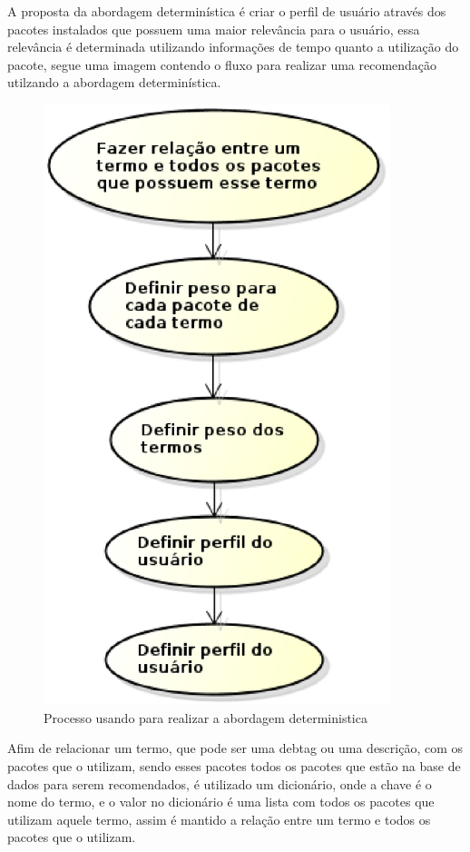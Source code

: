 A proposta da abordagem determinística é criar o perfil de usuário através
dos pacotes instalados que possuem uma maior relevância para o usuário,
essa relevância é determinada utilizando informações de tempo quanto a
utilização do pacote, segue uma imagem contendo o fluxo para realizar uma
recomendação utilzando a abordagem determinística.

\begin{figure}[h]
  \centering
  \includegraphics[width=0.9\textwidth]{figuras/abordagem_deterministica.eps}
  \caption{Processo usando para realizar a abordagem deterministica}
  \label{fig:abordatem_deterministica}
\end{figure}

Afim de relacionar um termo, que pode ser uma debtag ou uma descrição, com
os pacotes que o utilizam, sendo esses pacotes todos os pacotes que estão
na base de dados para serem recomendados, é utilizado um dicionário, onde
a chave é o nome do termo, e o valor no dicionário é uma lista com todos os
pacotes que utilizam aquele termo, assim é mantido a relação entre um termo
e todos os pacotes que o utilizam.

